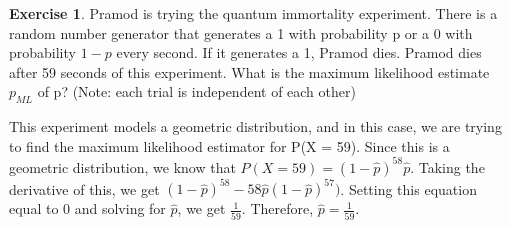 \documentclass[12pt]{amsart}
\theoremstyle{definition}
\newtheorem{exercise}{Exercise}
\numberwithin{equation}{section}
\theoremstyle{plain}
\begin{document}
\begin{exercise}
    Pramod is trying the quantum immortality experiment. There is a random number generator that generates a 1 with probability p or a 0 with probability $1-p$ every second. If it generates a 1, Pramod dies. Pramod dies after 59 seconds of this experiment. What is the maximum likelihood estimate $p_{ML}$ of p? (Note: each trial is independent of each
other)
\newline
\begin{answer}
This experiment models a geometric distribution, and in this case, we are trying to
find the maximum likelihood estimator for P(X = 59). Since this is a geometric distribution,
we know that $P(X = 59) = (1-\hat{p})^{58}\hat{p}$. Taking the derivative of this, we get $(1-\hat{p})^{58}-58\hat{p}(1-\hat{p})^{57})$. Setting this equation equal to 0 and solving for $\hat{p}$, we get $\frac{1}{59}$. Therefore, $\hat{p}=\frac{1}{59}$.
\end{answer}
\end{exercise}
\end{document}
